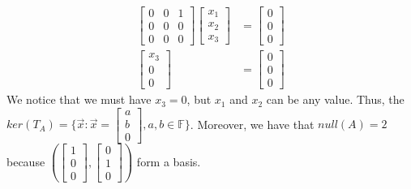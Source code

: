 \begin{example}
\begin{align*}
        \begin{bmatrix}
        0 & 0 & 1\\
        0 & 0 & 0\\
        0 & 0 & 0
    \end{bmatrix}\begin{bmatrix}
        x_1 \\ x_2 \\ x_3
    \end{bmatrix}&=\begin{bmatrix}
        0 \\ 0 \\ 0
    \end{bmatrix}\\
    \begin{bmatrix}
        x_3 \\ 0 \\ 0
    \end{bmatrix}&=\begin{bmatrix}
        0 \\ 0 \\ 0
    \end{bmatrix}
    \end{align*}
    We notice that we must have $x_3=0$, but $x_1$ and $x_2$ can be any value. Thus, the $ker(T_A)=\{\vec{x}:\vec{x}=\begin{bmatrix}
        a \\ b \\ 0
    \end{bmatrix}, a,b\in\mathbb{F}\}$. Moreover, we have that $null(A)=2$ because $(\begin{bmatrix}
        1 \\ 0 \\ 0
    \end{bmatrix},\begin{bmatrix}
        0 \\ 1 \\ 0
    \end{bmatrix})$ form a basis.
\end{example}
